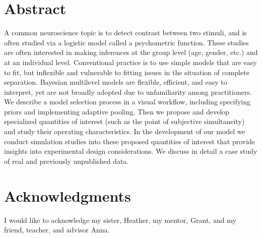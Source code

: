 \newpage
\setcounter{page}{1} %
\section*{Abstract}

A common neuroscience topic is to detect contrast between two stimuli, and is often studied via a logistic model called a psychometric function. These studies are often interested in making inferences at the group level (age, gender, etc.) and at an individual level. Conventional practice is to use simple models that are easy to fit, but inflexible and vulnerable to fitting issues in the situation of complete separation. Bayesian multilevel models are flexible, efficient, and easy to interpret, yet are not broadly adopted due to unfamiliarity among practitioners. We describe a model selection process in a visual workflow, including specifying priors and implementing adaptive pooling. Then we propose and develop specialized quantities of interest (such as the point of subjective simultaneity) and study their operating characteristics. In the development of our model we conduct simulation studies into these proposed quantities of interest that provide insights into experimental design considerations. We discuss in detail a case study of real and previously unpublished data.


\newpage
\section*{Acknowledgments}

I would like to acknowledge my sister, Heather, my mentor, Grant, and my friend, teacher, and advisor Anna.


\setcounter{tocdepth}{1}
\tableofcontents

\listoftables

\listoffigures
